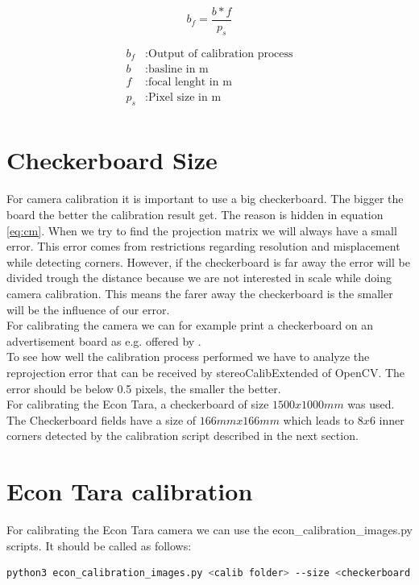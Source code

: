 \documentclass[11pt,a4paper,titlepage,oneside]{report}
\begin{document}
\begin{equation}\label{eq:bf}
	b_f=\frac{b*f}{p_s}
\end{equation}

\begin{align*}
	b_f &:	\text{Output of calibration process}\\
	b &:		\text{basline in m}\\
	f &:		\text{focal lenght in m}\\
	p_s &:	\text{Pixel size in m}\\
\end{align*}

\section{Checkerboard Size}

For camera calibration it is important to use a big checkerboard. The bigger the board the better the calibration result get. The reason is hidden in equation \ref{eq:cm}. When we try to find the projection matrix we will always have a small error. This error comes from restrictions regarding resolution and misplacement while detecting corners. However, if the checkerboard is far away the error will be divided trough the distance because we are not interested in scale while doing camera calibration. This means the farer away the checkerboard is the smaller will be the influence of our error.\\
For calibrating the camera we can for example print a checkerboard on an advertisement board as e.g. offered by \cite{mydisplay}.\\
To see how well the calibration process performed we have to analyze the reprojection error that can be received by stereoCalibExtended of OpenCV. The error should be below 0.5 pixels, the smaller the better.\\
For calibrating the Econ Tara, a checkerboard of size $1500x1000mm$ was used. The Checkerboard fields have a size of $166mmx166mm$ which leads to $8x6$ inner corners detected by the calibration script described in the next section.

\section{Econ Tara calibration}
For calibrating the Econ Tara camera we can use the econ\_calibration\_images.py scripts. It should be called as follows:
\begin{lstlisting}[language=bash]
python3 econ_calibration_images.py <calib folder> --size <checkerboard filed size>
\end{lstlisting}
\end{document}
